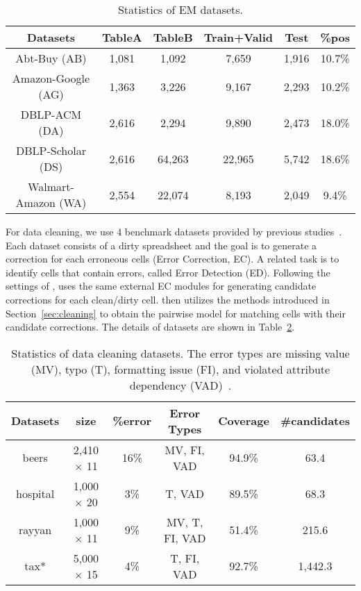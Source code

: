 \setlength{\tabcolsep}{2.5pt}
\begin{table}[!t]
\caption{Statistics of EM datasets. }\label{tab:em_dataset}
\small
\begin{tabular}{cccccc} \toprule
Datasets            & TableA & TableB & Train+Valid & Test & \%pos   \\ \midrule
Abt-Buy (AB)        & 1,081   & 1,092   & 7,659        & 1,916 & 10.7\% \\
Amazon-Google (AG)  & 1,363   & 3,226   & 9,167        & 2,293 & 10.2\% \\
DBLP-ACM (DA)       & 2,616   & 2,294   & 9,890        & 2,473 & 18.0\% \\
DBLP-Scholar (DS)   & 2,616   & 64,263  & 22,965       & 5,742 & 18.6\% \\
Walmart-Amazon (WA) & 2,554   & 22,074  & 8,193        & 2,049 & 9.4\% \\ \bottomrule
\end{tabular}
\vspace{-3mm}
\end{table}

For data cleaning, we use 4 benchmark datasets provided by previous studies~\cite{DBLP:journals/pvldb/MahdaviA20,DBLP:conf/sigmod/MahdaviAFMOS019}.
Each dataset consists of a dirty spreadsheet and the goal is to generate a correction for each erroneous cells
(Error Correction, EC). A related task is to identify cells that contain errors, called Error Detection (ED).
Following the settings of \baran,
\system uses the same external EC modules for generating candidate corrections for each clean/dirty cell.
\system then utilizes the methods introduced in Section~\ref{sec:cleaning} to obtain the pairwise model for matching cells with their candidate corrections.
The details of datasets are shown in Table~\ref{tab:cleaning_dataset}.


\setlength{\tabcolsep}{2pt}
\begin{table}[!ht]
\caption{Statistics of data cleaning datasets. The error types are missing value (MV), typo (T), formatting issue (FI),
and violated attribute dependency (VAD)~\cite{DBLP:journals/pvldb/MahdaviA20}. 
}\label{tab:cleaning_dataset}
\small
\begin{tabular}{cccccc} \toprule
Datasets & size & \%error & Error Types    &  Coverage & \#candidates \\ \midrule
beers    & 2,410 $\times$ 11        & 16\%    & MV, FI, VAD    & 94.9\%       & 63.4         \\
hospital & 1,000 $\times$ 20        & 3\%     & T, VAD         & 89.5\%       & 68.3         \\
rayyan   & 1,000 $\times$ 11        & 9\%     & MV, T, FI, VAD & 51.4\%       & 215.6         \\
tax*      & 5,000 $\times$ 15        & 4\%     & T, FI, VAD     & 92.7\%       & 1,442.3        \\ \bottomrule
\end{tabular}\vspace{-3mm}
\end{table}


